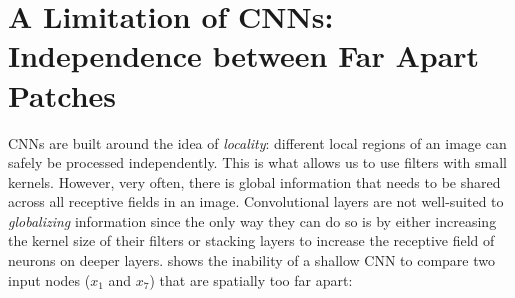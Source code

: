 
\section{A Limitation of CNNs: Independence between Far Apart Patches}
CNNs are built around the idea of \textit{locality}: different local regions of an image can safely be processed independently. This is what allows us to use filters with small kernels. However, very often, there is global information that needs to be shared across all receptive fields in an image. Convolutional layers are not well-suited to \textit{globalizing} information since the only way they can do so is by either increasing the kernel size of their filters or stacking layers to increase the receptive field of neurons on deeper layers. \Fig{\ref{fig:transformers:CNN_limitations}} shows the inability of a shallow CNN to compare two input nodes ($x_1$ and $x_7$) that are spatially too far apart:

